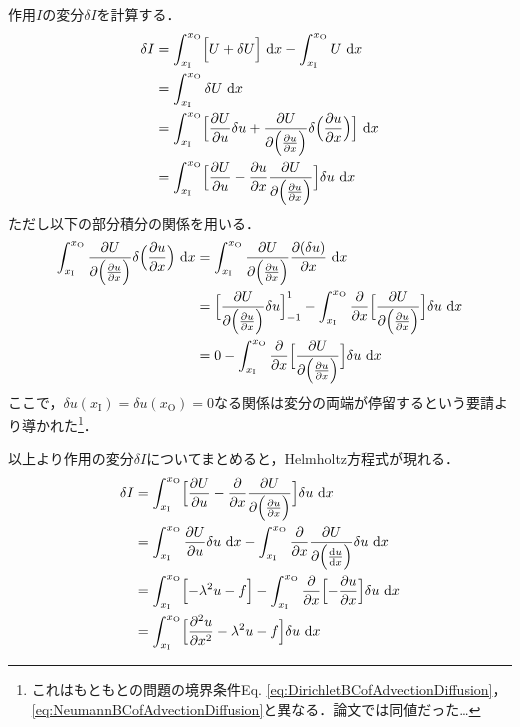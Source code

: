 \documentclass[12pt,a4paper]{jsarticle}
\begin{document}
作用$I$の変分$\delta I$を計算する．
\begin{align*}
  \delta I &= \int_{x_{\text{I}}}^{x_{\text{O}}} \Bigl[ U +\delta U \Bigr] ~\mathrm{d}x - \int_{x_{\text{I}}}^{x_{\text{O}}} U ~\mathrm{d}x \\
  &= \int_{x_{\text{I}}}^{x_{\text{O}}} \delta U ~\mathrm{d}x \\
  &= \int_{x_{\text{I}}}^{x_{\text{O}}} \Bigl[ \frac{\partial U}{\partial u} \delta u + \frac{\partial U}{\partial \Big( \frac{\partial u}{\partial x} \Big)} \delta \Big( \frac{\partial u}{\partial x} \Big) \Bigr] ~\mathrm{d}x \\
  &= \int_{x_{\text{I}}}^{x_{\text{O}}} \Bigl[ \frac{\partial U}{\partial u} - \frac{\partial u}{\partial x} \frac{\partial U}{\partial \Big( \frac{\partial u}{\partial x} \Big)} \Bigr] \delta u ~\mathrm{d}x
\end{align*}
ただし以下の部分積分の関係を用いる．
\begin{align*}
  \int_{x_{\text{I}}}^{x_{\text{O}}} \frac{\partial U}{\partial \Big( \frac{\partial u}{\partial x} \Big)} \delta \Big( \frac{\partial u}{\partial x} \Big) ~\mathrm{d}x
  &= \int_{x_{\text{I}}}^{x_{\text{O}}} \frac{\partial U}{\partial \Big( \frac{\partial u}{\partial x} \Big)} \frac{\partial (\delta u)}{\partial x} ~\mathrm{d}x \\
  &= \Bigl[ \frac{\partial U}{\partial \Big( \frac{\partial u}{\partial x} \Big)} \delta u \Bigr]_{-1}^{1} -\int_{x_{\text{I}}}^{x_{\text{O}}} \frac{\partial}{\partial x} \Bigl[ \frac{\partial U}{\partial \Big( \frac{\partial u}{\partial x} \Big) } \Bigr] \delta u ~\mathrm{d}x \\
  &= 0 -\int_{x_{\text{I}}}^{x_{\text{O}}} \frac{\partial}{\partial x} \Bigl[ \frac{\partial U}{\partial \Big( \frac{\partial u}{\partial x} \Big) } \Bigr] \delta u ~\mathrm{d}x
\end{align*}
ここで，$\delta u(x_{\text{I}}) = \delta u(x_{\text{O}}) = 0$なる関係は変分の両端が停留するという要請より導かれた\footnote{これはもともとの問題の境界条件Eq. \ref{eq:DirichletBCofAdvectionDiffusion}，\ref{eq:NeumannBCofAdvectionDiffusion}と異なる．論文では同値だった…}．

以上より作用の変分$\delta I$についてまとめると，Helmholtz方程式が現れる．
\begin{align*}
  \delta I &= \int_{x_{\text{I}}}^{x_{\text{O}}} \Bigl[ \frac{\partial U}{\partial u} - \frac{\partial}{\partial x} \frac{\partial U}{\partial \Big( \frac{\partial u}{\partial x} \Big)} \Bigr] \delta u ~\mathrm{d}x \\
  &= \int_{x_{\text{I}}}^{x_{\text{O}}} \frac{\partial U}{\partial u} \delta u ~\mathrm{d} x - \int_{x_{\text{I}}}^{x_{\text{O}}} \frac{\partial}{\partial x} \frac{\partial U}{\partial \Big( \frac{\mathrm{d} u}{\mathrm{d} x} \Big)} \delta u ~\mathrm{d} x \\
  &= \int_{x_{\text{I}}}^{x_{\text{O}}} \Bigl[ -\lambda^2 u -f \Bigr] - \int_{x_{\text{I}}}^{x_{\text{O}}}  \frac{\partial}{\partial x} \Bigl[ -\frac{\partial u}{\partial x} \Bigr] \delta u ~\mathrm{d} x \\
  &= \int_{x_{\text{I}}}^{x_{\text{O}}} \Bigl[ \frac{\partial^2 u}{\partial x^2} -\lambda^2 u -f \Bigr] \delta u ~\mathrm{d} x
\end{align*}
\end{document}
